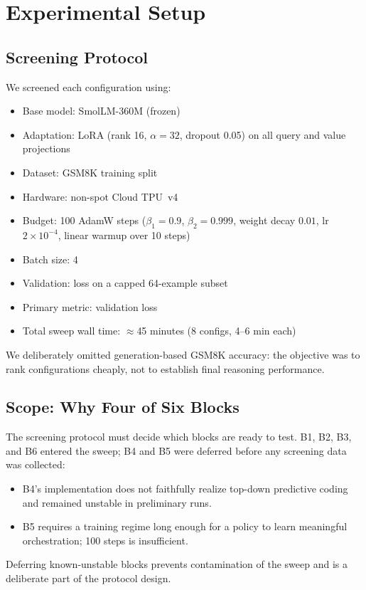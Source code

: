 \documentclass[11pt]{article}
\begin{document}
\section{Experimental Setup}
\label{sec:setup}

\subsection{Screening Protocol}

We screened each configuration using:
\begin{itemize}[leftmargin=1.5em]
  \item Base model: SmolLM-360M \citep{smollm360m,smollm3blog2025} (frozen)
  \item Adaptation: LoRA \citep{hu2022lora} (rank 16, $\alpha{=}32$,
        dropout 0.05) on all query and value projections
  \item Dataset: GSM8K training split \citep{cobbe2021gsm8k}
  \item Hardware: non-spot Cloud TPU~v4
  \item Budget: 100 AdamW steps ($\beta_1{=}0.9$, $\beta_2{=}0.999$, weight
        decay $0.01$, lr $2{\times}10^{-4}$, linear warmup over 10 steps)
  \item Batch size: 4
  \item Validation: loss on a capped 64-example subset
  \item Primary metric: validation loss
  \item Total sweep wall time: ${\approx}$45 minutes (8 configs, 4--6 min each)
\end{itemize}

We deliberately omitted generation-based GSM8K accuracy: the objective was to
rank configurations cheaply, not to establish final reasoning performance.

\subsection{Scope: Why Four of Six Blocks}
\label{sec:scope}

The screening protocol must decide which blocks are ready to test.
B1, B2, B3, and B6 entered the sweep; B4 and B5 were deferred before any
screening data was collected:
\begin{itemize}[leftmargin=1.5em]
  \item B4's implementation does not faithfully realize top-down predictive
        coding and remained unstable in preliminary runs.
  \item B5 requires a training regime long enough for a policy to learn
        meaningful orchestration; 100 steps is insufficient.
\end{itemize}
Deferring known-unstable blocks prevents contamination of the sweep and is a
deliberate part of the protocol design.
\end{document}
